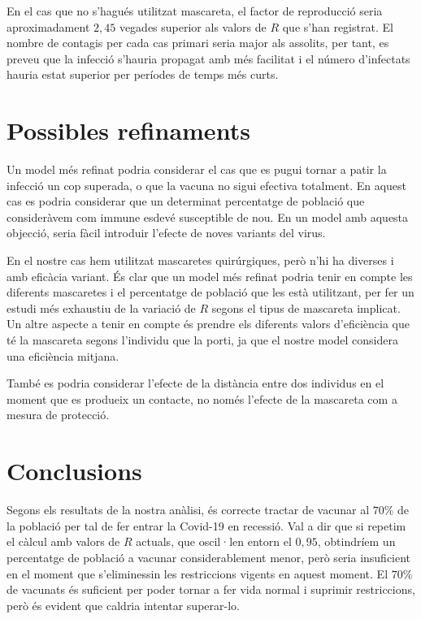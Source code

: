 \documentclass[11pt,a4paper]{article}
\begin{document}
	En el cas que no s'hagués utilitzat mascareta, el factor de reproducció seria aproximadament $2,45$ vegades superior als valors de $R$ que s'han registrat. El nombre de contagis per cada cas primari seria major als assolits, per tant, es preveu que la infecció s'hauria propagat amb més facilitat i el número d'infectats hauria estat superior per períodes de temps més curts.
	\section{Possibles refinaments}
	Un model més refinat podria considerar el cas que es pugui tornar a patir la infecció un cop superada, o que la vacuna no sigui efectiva totalment. En aquest cas es podria considerar que un determinat percentatge de població que consideràvem com immune esdevé susceptible de nou. En un model amb aquesta objecció, seria fàcil introduir l'efecte de noves variants del virus. 
	
	En el nostre cas hem utilitzat mascaretes quirúrgiques, però n'hi ha diverses i amb eficàcia variant. És clar que un model més refinat podria tenir en compte les diferents mascaretes i el percentatge de població que les està utilitzant, per fer un estudi més exhaustiu de la variació de $R$ segons el tipus de mascareta implicat.
	Un altre aspecte a tenir en compte és prendre els diferents valors d'eficiència que té la mascareta segons l'individu que la porti, ja que el nostre model considera una eficiència mitjana.
	
	També es podria considerar l'efecte de la distància entre dos individus en el moment que es produeix un contacte, no només l'efecte de la mascareta com a mesura de protecció. 
	\section{Conclusions}
	Segons els resultats de la nostra anàlisi, és correcte tractar de vacunar al $70\%$ de la població per tal de fer entrar la Covid-19 en recessió. Val a dir que si repetim el càlcul amb valors de $R$ actuals, que oscil·len entorn el $0,95$, obtindríem un percentatge de població a vacunar considerablement menor, però seria insuficient en el moment que s'eliminessin les restriccions vigents en aquest moment.\cite{catsalut} El $70\%$ de vacunats és suficient per poder tornar a fer vida normal i suprimir restriccions, però és evident que caldria intentar superar-lo.
	
\end{document}
